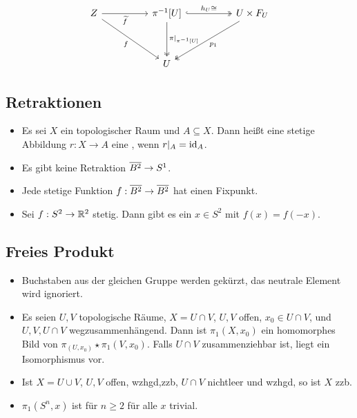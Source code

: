 \documentclass[8pt]{extarticle}
\begin{document}
\begin{itemize}
	\[\begin{tikzcd}
		Z && {\pi^{-1}[U]} && {U \times F_U} \\
		\\
		&& U
		\arrow["{\tilde f}"', from=1-1, to=1-3]
		\arrow["f"', from=1-1, to=3-3]
		\arrow["{h_U \cong}", hook, two heads, from=1-3, to=1-5]
		\arrow["{\pi|_{\pi^{-1}[U]}}", two heads, from=1-3, to=3-3]
		\arrow["{p_1}", two heads, from=1-5, to=3-3]
	\end{tikzcd}\]
\end{itemize}
\subsection*{Retraktionen}
\begin{itemize}
	\item Es sei $X$ ein topologischer Raum und $A \subseteq X$. Dann heißt eine stetige Abbildung $r : X \to A$ eine , wenn $r|_A = \textnormal{id}_A$.
	\item Es gibt keine Retraktion $\overline{{B^2}} \to S^1$.
	\item {} Jede stetige Funktion $f : \overline{{B^2}} \to \overline{{B^2}}$ hat einen Fixpunkt.
	\item {} Sei $f : S^2 \to \mathbb{R}^2$ stetig. Dann gibt es ein $x \in S^2$ mit $f(x) = f(-x)$.
\end{itemize}
\subsection*{Freies Produkt}
\begin{itemize}
	\item {} Buchstaben aus der gleichen Gruppe werden gekürzt, das neutrale Element wird ignoriert.
	\item {} Es seien $U,V$ topologische Räume, $X = U \cap V$, $U,V$ offen, $x_0 \in U \cap V$, und $U,V,U \cap V$ wegzusammenhängend. Dann ist $\pi_1(X,x_0)$ ein homomorphes Bild von $\pi_(U,x_0) \star \pi_1(V,x_0)$. Falls $U \cap V$ zusammenziehbar ist, liegt ein Isomorphismus vor.
	\item {} Ist $X = U \cup V$, $U,V$ offen, wzhgd,zzb, $U \cap V$ nichtleer und wzhgd, so ist $X$ zzb.
	\item {} $\pi_1(S^n,x)$ ist für $n \geq 2$ für alle $x$ trivial.  
\end{itemize}
\end{document}

